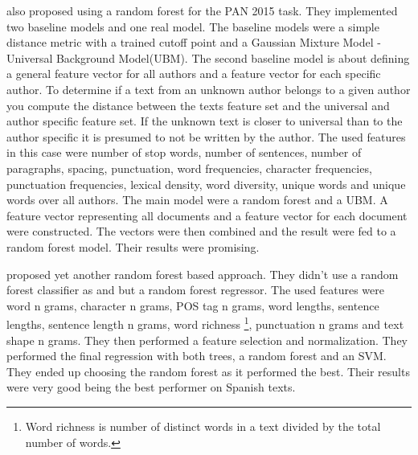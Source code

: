 \cite{pacheco2015} also proposed using a random forest for the PAN 2015 task.
They implemented two baseline models and one real model. The baseline models
were a simple distance metric with a trained cutoff point and a Gaussian Mixture
Model - Universal Background Model(UBM). The second baseline model is about
defining a general feature vector for all authors and a feature vector for
each specific author. To determine if a text from an unknown author belongs
to a given author you compute the distance between the texts feature set and
the universal and author specific feature set. If the unknown text is closer
to universal than to the author specific it is presumed to not be written by
the author. The used features in this case were number of stop words, number
of sentences, number of paragraphs, spacing, punctuation, word frequencies,
character frequencies, punctuation frequencies, lexical density, word diversity,
unique words and unique words over all authors. The main model were a random
forest and a UBM. A feature vector representing all documents and a feature
vector for each document were constructed. The vectors were then combined and
the result were fed to a random forest model. Their results were promising.

\cite{bartoli2015b} proposed yet another random forest based approach.
They didn't use a random forest classifier as \cite{maitra2015} and
\cite{pacheco2015} but a random forest regressor. The used features were word n
grams, character n grams, \gls{POS} tag n grams, word lengths, sentence lengths,
sentence length n grams, word richness \footnote{Word richness is number of
                                                 distinct words in a text 
divided by the total number of words.}, punctuation
n grams and text shape n grams. They then performed a feature selection and
normalization. They performed the final regression with both trees, a random
forest and an SVM. They ended up choosing the random forest as it performed the
best. Their results were very good being the best performer on Spanish texts.

